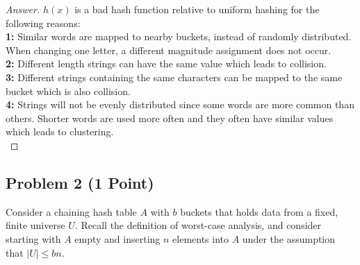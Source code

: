 \documentclass[11pt]{article}
\theoremstyle{definition}
\theoremstyle{definition}
\theoremstyle{definition}
\begin{document}
\begin{proof}[Answer]
$h(x)$ is a bad hash function relative to uniform hashing for the following reasons:\\

\textbf{1: } Similar words are mapped to nearby buckets, instead of randomly distributed. When changing one letter, a different magnitude assignment does not occur.\\

\textbf{2: } Different length strings can have the same value which leads to collision.\\

\textbf{3: }Different strings containing the same characters can be mapped to the same bucket which is also collision.\\

\textbf{4: }Strings will not be evenly distributed since some words are more common than others. Shorter words are used more often and they often have similar values which leads to clustering.\\
\end{proof}

\newpage
\subsection{Problem 2 (1 Point)}
Consider a chaining hash table $A$ with $b$ buckets that holds data from a fixed, finite universe $U$. Recall the definition of worst-case analysis, and consider starting with $A$ empty and inserting $n$ elements into $A$ under the assumption that $|U|\le bn$. 
    
\end{document}
